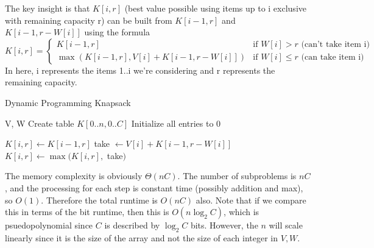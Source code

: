 \documentclass{article}
\begin{document}
    \begin{algo}
      The key insight is that $K[i,r]$ (best value possible using items up to i exclusive with remaining capacity r) can be built from $K[i-1,r]$ and $K[i-1,r-W[i]]$ using the formula 
      \begin{equation}
        K[i,r] = \begin{cases}
          K[i-1,r] & \text{if } W[i] > r \text{ (can't take item i)} \\
          \max(K[i-1,r], V[i] + K[i-1,r-W[i]]) & \text{if } W[i] \leq r \text{ (can take item i)}
        \end{cases}        
      \end{equation}
      In here, i represents the items 1..i we're considering and r represents the remaining capacity.
      \begin{algorithm}[H]
        \caption{Dynamic Programming Knapsack}
        \label{alg:dpknap}
        \begin{algorithmic}
          \State V, W
            \State Create table $K[0..n, 0..C]$ 
            \State Initialize all entries to 0
            
              
                
                \State $K[i,r] \gets K[i-1,r]$  
                  
                  \State take $\gets V[i] + K[i-1,r-W[i]]$  
                  \State $K[i,r] \gets \max(K[i,r],$ take$)$  
                \EndIf
              \EndFor
            \EndFor
            
            \State {}  
          \EndFunction
        \end{algorithmic}
      \end{algorithm}
      The memory complexity is obviously $\Theta(n C)$. The number of subproblems is $nC$, and the processing for each step is constant time (possibly addition and max), so $O(1)$. Therefore the total runtime is $O(nC)$ also. Note that if we compare this in terms of the bit runtime, then this is $O(n \log_2 C)$, which is psuedopolynomial since $C$ is described by $\log_2 {C}$ bits. However, the $n$ will scale linearly since it is the size of the array and not the size of each integer in $V, W$. 
    \end{algo}
\end{document}
